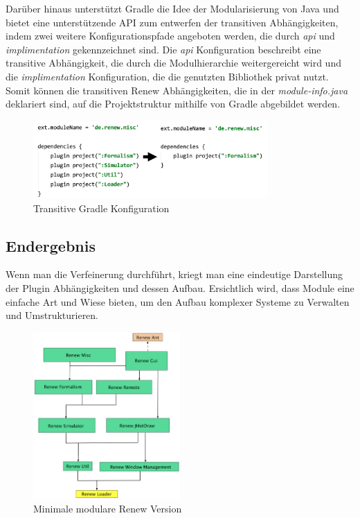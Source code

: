 	Darüber hinaus unterstützt Gradle die Idee der Modularisierung von Java und bietet eine unterstützende API zum entwerfen der transitiven Abhängigkeiten, indem zwei weitere Konfigurationspfade angeboten werden, die durch \textit{api} und \textit{implimentation} gekennzeichnet sind. Die \textit{api} Konfiguration beschreibt eine transitive Abhängigkeit, die durch die Modulhierarchie weitergereicht wird und die \textit{implimentation} Konfiguration, die die genutzten Bibliothek privat nutzt. Somit können die transitiven Renew Abhängigkeiten, die in der \textit{module-info.java} deklariert sind, auf die Projektstruktur mithilfe von Gradle abgebildet werden. 
	\begin{figure}[h!]
	  \centering
	  \includegraphics[width=0.8\textwidth]{material/images/gradle_misc.png}
	  \caption{Transitive Gradle Konfiguration}
	  \label{fig:trans_gradle}
	\end{figure}

\subsection{Endergebnis} \label{sub:endergebnis}
	
	Wenn man die Verfeinerung durchführt, kriegt man eine eindeutige Darstellung der Plugin Abhängigkeiten und dessen Aufbau. Ersichtlich wird, dass Module eine einfache Art und Wiese bieten, um den Aufbau komplexer Systeme zu Verwalten und Umstrukturieren.    
	\begin{figure}[h!]
	  \centering
	  \includegraphics[width=0.5\textwidth]{material/images/tree_trans.png}
	  \caption{Minimale modulare Renew Version}
	  \label{fig:trans_config}
	\end{figure}









